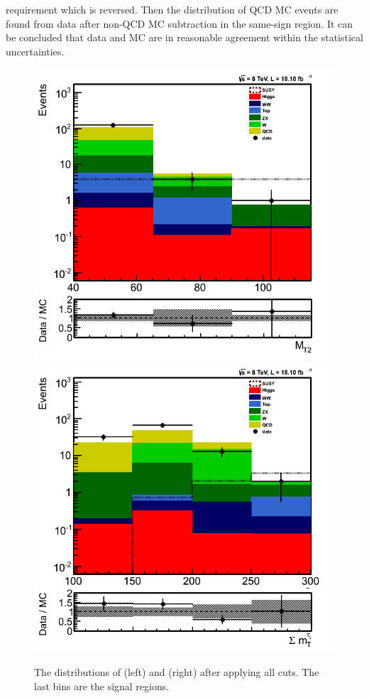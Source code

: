 requirement which is reversed. Then the distribution of QCD MC events are found from data after non-QCD MC subtraction 
in the same-sign region. It can be concluded that data and MC are in reasonable agreement within the statistical uncertainties. 
\begin{figure}[!Hhtb]
\centering
\includegraphics[angle=0,scale=0.35]{TauTauFigs/MT2_SSQCD_dataunblinding.png}
\includegraphics[angle=0,scale=0.35]{TauTauFigs/SumMT_SSQCD_dataunblinding.png} \\
\caption{The distributions of \mttwo (left) and \SumMT (right) after applying all cuts. The last bins are the signal regions.}
\label{fig:comparison}
\end{figure}
